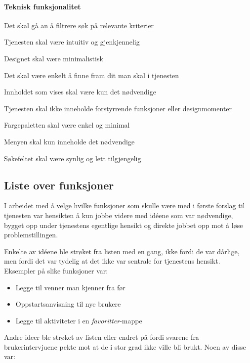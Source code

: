 \paragraph{Teknisk funksjonalitet}
\begin{compactitem}
\item Det skal gå an å filtrere søk på relevante kriterier
\item Tjenesten skal være intuitiv og gjenkjennelig
\item Designet skal være minimalistisk
\item Det skal være enkelt å finne fram dit man skal i tjenesten
\item Innholdet som vises skal være kun det nødvendige
\item Tjenesten skal ikke inneholde forstyrrende funksjoner eller designmomenter
\item Fargepaletten skal være enkel og minimal
\item Menyen skal kun inneholde det nødvendige
\item Søkefeltet skal være synlig og lett tilgjengelig
\end{compactitem}

\subsection{Liste over funksjoner}
\label{section:forslag1-liste-over-funksjoner}
I arbeidet med å velge hvilke funksjoner som skulle være med i første forslag til tjenesten var hensikten å kun jobbe videre med idéene som var nødvendige, bygget opp under tjenestens egentlige hensikt og direkte jobbet opp mot å løse problemstillingen.

Enkelte av idéene ble strøket fra listen med en gang, ikke fordi de var dårlige, men fordi det var tydelig at det ikke var sentrale for tjenestens hensikt. Eksempler på slike funksjoner var:

\begin{itemize}
    \item Legge til venner man kjenner fra før
    \item Oppstartsanvisning til nye brukere
    \item Legge til aktiviteter i en {\em favoritter}-mappe
\end{itemize}

Andre ideer ble strøket av listen eller endret på fordi svarene fra brukerintervjuene pekte mot at de i stor grad ikke ville bli brukt. Noen av disse var:

